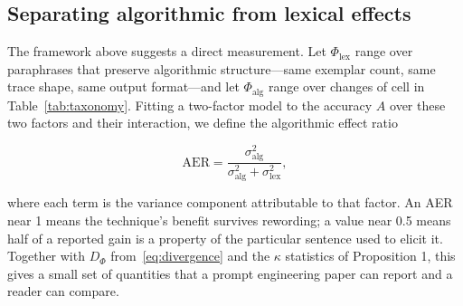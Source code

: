 \documentclass[conference]{IEEEtran}
\begin{document}
\subsection{Separating algorithmic from lexical effects}
\label{sec:aer}

The framework above suggests a direct measurement. Let $\Phi_{\mathrm{lex}}$ range over paraphrases that preserve algorithmic structure---same exemplar count, same trace shape, same output format---and let $\Phi_{\mathrm{alg}}$ range over changes of cell in Table~\ref{tab:taxonomy}. Fitting a two-factor model to the accuracy $A$ over these two factors and their interaction, we define the algorithmic effect ratio

\begin{equation}
\mathrm{AER} = \frac{\sigma_{\mathrm{alg}}^{2}}{\sigma_{\mathrm{alg}}^{2} + \sigma_{\mathrm{lex}}^{2}},
\label{eq:aer}
\end{equation}

where each term is the variance component attributable to that factor. An AER near 1 means the technique's benefit survives rewording; a value near 0.5 means half of a reported gain is a property of the particular sentence used to elicit it. Together with $D_{\Phi}$ from~\eqref{eq:divergence} and the $\kappa$ statistics of Proposition 1, this gives a small set of quantities that a prompt engineering paper can report and a reader can compare.
\end{document}
